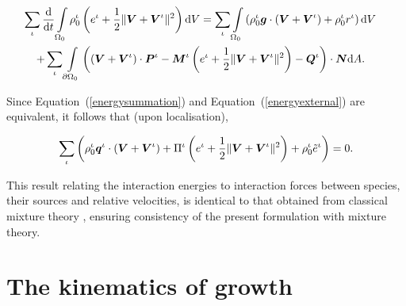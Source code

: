 \begin{eqnarray}
\sum\limits_{\iota}\frac{\mathrm{d}}{\mathrm{d}t}
\int\limits_{\Omega_0}\rho_0^\iota \left ( e^\iota + \frac{1}{2}
\Vert\mbox{\boldmath$ V$}+\mbox{\boldmath$ V$}^\iota\Vert^2 \right ) \mathrm{d}V =
\sum\limits_{\iota}\int\limits_{\Omega_0} \left(\rho_0^\iota\mbox{\boldmath$ g$}
\cdot\left(\mbox{\boldmath$ V$}+\mbox{\boldmath$ V$}^\iota\right) + \rho_0^\iota r^\iota
\right)\mathrm{d}V &
&\nonumber\\
+\sum\limits_{\iota}\int\limits_{\partial
\Omega_0}\left(\left(\mbox{\boldmath$ V$}+\mbox{\boldmath$ V$}^\iota\right)\cdot\mbox{\boldmath$ P$}^\iota -
\mbox{\boldmath$ M$}^\iota\left(e^\iota +\frac{1}{2}
\Vert\mbox{\boldmath$ V$}+\mbox{\boldmath$ V$}^\iota\Vert^2\right) -
\mbox{\boldmath$ Q$}^\iota\right)\cdot\mbox{\boldmath$ N$}\mathrm{d}A.\quad& &
\label{energyexternal}
\end{eqnarray}

Since Equation~(\ref{energysummation}) and
Equation~(\ref{energyexternal}) are equivalent, it follows that (upon
localisation),

\begin{eqnarray}
\sum\limits_{\iota}\left(\rho_0^\iota\mbox{\boldmath$ q$}^\iota\cdot(\mbox{\boldmath$ V$}+\mbox{\boldmath$ V$}^\iota)
+ \Pi^\iota\left(e^\iota +
\frac{1}{2}\Vert\mbox{\boldmath$ V$}+\mbox{\boldmath$ V$}^\iota\Vert^2\right) +
\rho^\iota_0\tilde{e}^\iota\right) =
0. \label{energysummationresult}
\end{eqnarray}

\noindent This result relating the interaction energies to interaction
forces between species, their sources and relative velocities, is
identical to that obtained from classical mixture theory
\citep{TruesdellNoll:65}, ensuring consistency of the present
formulation with mixture theory.

\section{The kinematics of growth}
\label{kinematics-of-growth}

